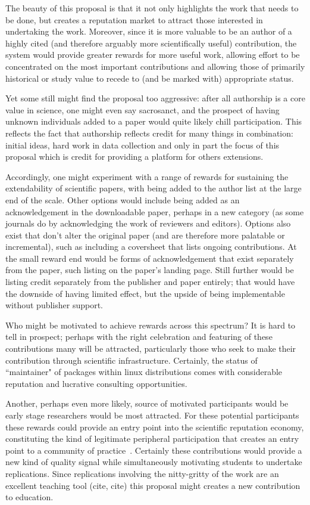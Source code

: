 \documentclass{sigchi}
\begin{document}
The beauty of this proposal is that it not only highlights the work that needs to be done, but creates a reputation market to attract those interested in undertaking the work. Moreover, since it is more valuable to be an author of a highly cited (and therefore arguably more scientifically useful) contribution, the system would provide greater rewards for more useful work, allowing effort to be concentrated on the most important contributions and allowing those of primarily historical or study value to recede to (and be marked with) appropriate status.

Yet some still might find the proposal too aggressive: after all authorship is a core value in science, one might even say sacrosanct, and the prospect of having unknown individuals added to a paper would quite likely chill participation. This reflects the fact that authorship reflects credit for many things in combination: initial ideas, hard work in data collection and only in part the focus of this proposal which is credit for providing a platform for others extensions.  

Accordingly, one might experiment with a range of rewards for sustaining the extendability of scientific papers, with being added to the author list at the large end of the scale. Other options would include being added as an acknowledgement in the downloadable paper, perhaps in a new category (as some journals do by acknowledging the work of reviewers and editors). Options also exist that don't alter the original paper (and are therefore more palatable or incremental), such as including a coversheet that lists ongoing contributions. At the small reward end would be forms of acknowledgement that exist separately from the paper, such listing on the paper's landing page. Still further would be listing credit separately from the publisher and paper entirely; that would have the downside of having limited effect, but the upside of being implementable without publisher support.

Who might be motivated to achieve rewards across this spectrum? It is hard to tell in prospect; perhaps with the right celebration and featuring of these contributions many will be attracted, particularly those who seek to make their contribution through scientific infrastructure.  Certainly, the status of ``maintainer" of packages within linux distributions comes with considerable reputation and lucrative consulting opportunities.  

Another, perhaps even more likely, source of motivated participants would be early stage researchers would be most attracted. For these potential participants these rewards could provide an entry point into the scientific reputation economy, constituting the kind of legitimate peripheral participation that creates an entry point to a community of practice~\cite{wenger_communities_1998}. Certainly these contributions would provide a new kind of quality signal while simultaneously motivating students to undertake replications. Since replications involving the nitty-gritty of the work are an excellent teaching tool (cite, cite) this proposal might creates a new contribution to education.
\end{document}
